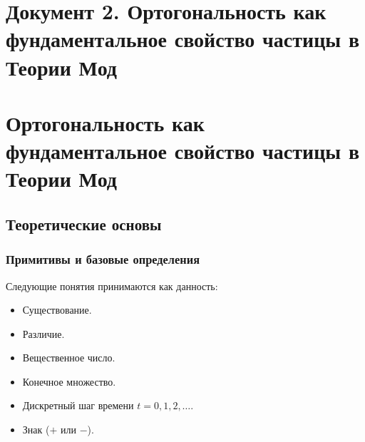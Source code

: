 \documentclass[12pt,a4paper]{article}
\begin{document}

\newpage
\section*{Документ 2. Ортогональность как фундаментальное свойство частицы в Теории Мод}

\section{Ортогональность как фундаментальное свойство частицы в Теории Мод}

\begin{abstract}
Настоящий документ вводит и формализует понятие ортогональности --- фундаментальной характеристики частицы, определяющей её реакцию на внешний импульс и внутреннюю природу. В рамках Теории Мод ортогональность рассматривается как угол поворота собственной моды частицы относительно её внешних мод. Показано, что ортогональность $O$ связана с массой $m$ простым соотношением $|O| = 2m$ (в энергетических единицах) и с лоренц-фактором как $O = 1/\gamma$. Документ содержит полное теоретическое обоснование, математический аппарат, численные расчёты для всех фундаментальных частиц Стандартной Модели и экспериментальные предсказания. Документ самодостаточен и не требует обращения к внешним источникам.
\end{abstract}

\subsection{Теоретические основы}

\subsubsection{Примитивы и базовые определения}
Следующие понятия принимаются как данность:
\begin{itemize}
    \item Существование.
    \item Различие.
    \item Вещественное число.
    \item Конечное множество.
    \item Дискретный шаг времени $t = 0, 1, 2, \dots$.
    \item Знак ($+$ или $-$).
\end{itemize}
\end{document}
